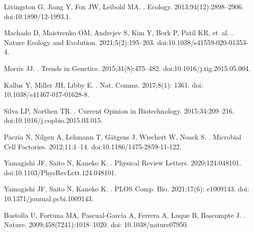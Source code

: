 \documentclass[10pt,letterpaper]{article}
\begin{document}
\begin{thebibliography}{10}
Livingston G, Jiang Y, Fox JW, Leibold MA.
.
\newblock Ecology. 2013;94(12):2898--2906.
\newblock doi:{10.1890/12-1993.1}.

Machado D, Maistrenko OM, Andrejev S, Kim Y, Bork P, Patil KR, et~al.
.
\newblock Nature Ecology and Evolution. 2021;5(2):195--203.
\newblock doi:{10.1038/s41559-020-01353-4}.

Morris JJ.
.
\newblock Trends in Genetics. 2015;31(8):475--482.
\newblock doi:{10.1016/j.tig.2015.05.004}.

Kallus Y, Miller JH, Libby E.
.
\newblock Nat. Comms. 2017;8(1): 1361.
\newblock doi: {10.1038/s41467-017-01628-8}.

Silva LP, Northen TR.
.
\newblock Current Opinion in Biotechnology. 2015;34:209--216.
\newblock doi:{10.1016/j.copbio.2015.03.015}.

Paczia N, Nilgen A, Lehmann T, G{\"{a}}tgens J, Wiechert W, Noack S.
.
\newblock Microbial Cell Factories. 2012;11:1--14.
\newblock doi:{10.1186/1475-2859-11-122}.

Yamagishi JF, Saito N, Kaneko K.
.
\newblock Physical Review Letters. 2020;124:048101.
\newblock doi:{10.1103/PhysRevLett.124.048101}.

Yamagishi JF, Saito N, Kaneko K.
.
\newblock PLOS Comp. Bio. 2021;17(6): e1009143.
\newblock doi: {10.1371/journal.pcbi.1009143}.

Bastolla U, Fortuna MA, Pascual-Garc{\'{i}}a A, Ferrera A, Luque B, Bascompte J.
.
\newblock Nature. 2009;458(7241):1018--1020.
\newblock doi: {10.1038/nature07950}.


\end{thebibliography}
\end{document}
